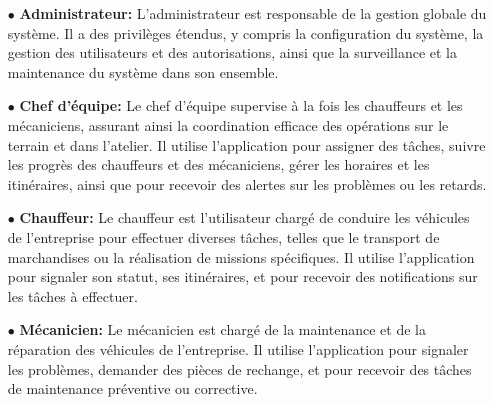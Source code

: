 \begin{itemize}

  \item[$\bullet$] \textbf {Administrateur:} L'administrateur est responsable de la gestion globale du système. Il a des privilèges étendus, y compris la configuration du système, la gestion des utilisateurs et des autorisations, ainsi que la surveillance et la maintenance du système dans son ensemble. \\

  \item[$\bullet$] \textbf{Chef d'équipe:} Le chef d'équipe supervise à la fois les chauffeurs et les mécaniciens, assurant ainsi la coordination efficace des opérations sur le terrain et dans l'atelier. Il utilise l'application pour assigner des tâches, suivre les progrès des chauffeurs et des mécaniciens, gérer les horaires et les itinéraires, ainsi que pour recevoir des alertes sur les problèmes ou les retards. \\

  \item[$\bullet$] \textbf{Chauffeur:} Le chauffeur est l'utilisateur chargé de conduire les véhicules de l'entreprise pour effectuer diverses tâches, telles que le transport de marchandises ou la réalisation de missions spécifiques. Il utilise l'application pour signaler son statut, ses itinéraires, et pour recevoir des notifications sur les tâches à effectuer. \\

  \item[$\bullet$] \textbf {Mécanicien:} Le mécanicien est chargé de la maintenance et de la réparation des véhicules de l'entreprise. Il utilise l'application pour signaler les problèmes, demander des pièces de rechange, et pour recevoir des tâches de maintenance préventive ou corrective.\\

\end{itemize}

